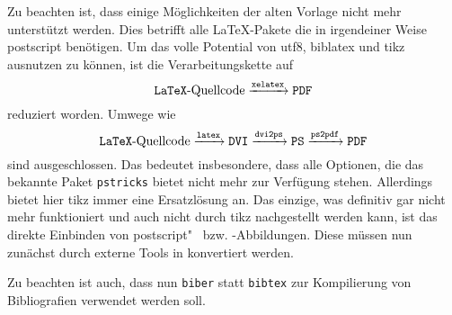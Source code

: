 Zu beachten ist, dass einige Möglichkeiten der alten Vorlage nicht mehr unterstützt werden.
Dies betrifft alle LaTeX-Pakete die in irgendeiner Weise \gls{postscript} benötigen.
Um das volle Potential von \gls{utf8}, \gls{biblatex} und \gls{tikz} ausnutzen zu können, ist die Verarbeitungskette auf
\begin{equation*}
\text{\texttt{LaTeX}-Quellcode} \xrightarrow{\text{\texttt{xelatex}}} \text{\texttt{PDF}}
\end{equation*}
reduziert worden.
Umwege wie
\begin{equation*}
\text{\texttt{LaTeX}-Quellcode} \xrightarrow{\text{\texttt{latex}}} \text{\texttt{DVI}} \xrightarrow{\text{\texttt{dvi2ps}}} \text{\texttt{PS}} \xrightarrow{\text{\texttt{ps2pdf}}} \text{\texttt{PDF}}
\end{equation*}
sind ausgeschlossen.
Das bedeutet insbesondere, dass alle Optionen, die das bekannte Paket \texttt{pstricks} bietet nicht mehr zur Verfügung stehen.
Allerdings bietet hier \gls{tikz} immer eine Ersatzlösung an.
Das einzige, was definitiv gar nicht mehr funktioniert und auch nicht durch \gls{tikz} nachgestellt werden kann, ist das direkte Einbinden von \gls{postscript}"~ bzw. -Abbildungen.
Diese müssen nun zunächst durch externe Tools in  konvertiert werden.

Zu beachten ist auch, dass nun \texttt{biber} statt \texttt{bibtex} zur Kompilierung von Bibliografien verwendet werden soll.
